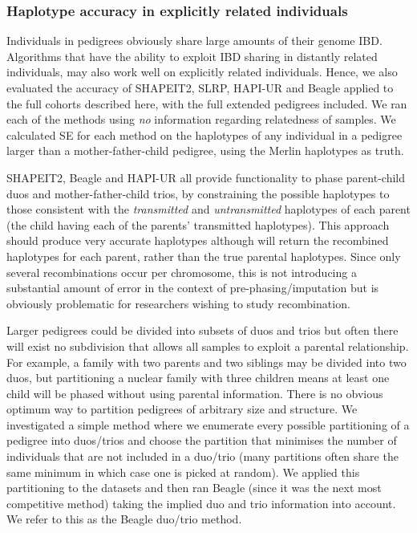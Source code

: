 \subsubsection{Haplotype accuracy in explicitly related individuals}

Individuals in pedigrees obviously share large amounts of their genome IBD.  Algorithms that have the ability to exploit IBD sharing in distantly related individuals, may also work well on explicitly related individuals.  Hence, we also evaluated the accuracy of SHAPEIT2, SLRP, HAPI-UR and Beagle applied to the full cohorts described here, with the full extended pedigrees included.  We ran each of the methods using \emph{no} information regarding relatedness of samples.  We calculated SE for each method on the haplotypes of any individual in a pedigree larger than a mother-father-child pedigree, using the Merlin haplotypes as truth. 

SHAPEIT2, Beagle and HAPI-UR all provide functionality to phase parent-child duos and mother-father-child trios, by constraining the possible haplotypes to those consistent with the \emph{transmitted} and \emph{untransmitted} haplotypes of each parent (the child having each of the parents' transmitted haplotypes).  This approach should produce very accurate haplotypes although will return the recombined haplotypes for each parent, rather than the true parental haplotypes.  Since only several recombinations occur per chromosome, this is not introducing a substantial amount of error in the context of pre-phasing/imputation but is obviously problematic for researchers wishing to study recombination.  

Larger pedigrees could be divided into subsets of duos and trios but often there will exist no subdivision that allows all samples to exploit a parental relationship.  For example, a family with two parents and two siblings may be divided into two duos, but partitioning a nuclear family with three children means at least one child will be phased without using parental information. There is no obvious optimum way to partition pedigrees of arbitrary size and structure. We investigated a simple method where we enumerate every possible partitioning of a pedigree into duos/trios and choose the partition that minimises the number of individuals that are not included in a duo/trio (many partitions often share the same minimum in which case one is picked at random).  We applied this partitioning to the datasets and then ran Beagle (since it was the next most competitive method) taking the implied duo and trio information into account. We refer to this as the Beagle duo/trio method.  

